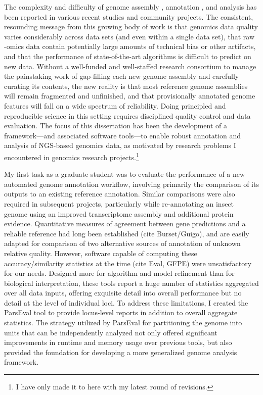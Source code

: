 The complexity and difficulty of genome assembly \cite{Assemblathon1,Assemblathon2,GAGE,QUAST}, annotation \cite{EGASP,Eilbeck,DentonFly}, and analysis \cite{PigWatson,RnaSeqTrim,RnaSeqTrim2} has been reported in various recent studies and community projects.
The consistent, resounding message from this growing body of work is that genomics data quality varies considerably across data sets (and even within a single data set), that raw -omics data contain potentially large amounts of technical bias or other artifacts, and that the performance of state-of-the-art algorithms is difficult to predict on new data.
Without a well-funded and well-staffed research consortium to manage the painstaking work of gap-filling each new genome assembly and carefully curating its contents, the new reality is that most reference genome assemblies will remain fragmented and unfinished, and that provisionally annotated genome features will fall on a wide spectrum of reliability.
Doing principled and reproducible science in this setting requires disciplined quality control and data evaluation.
The focus of this dissertation has been the development of a framework---and associated software tools---to enable robust annotation and analysis of NGS-based genomics data, as motivated by research problems I encountered in genomics research projects.\footnote{I have only made it to here with my latest round of revisions.}

My first task as a graduate student was to evaluate the performance of a new automated genome annotation workflow, involving primarily the comparison of its outputs to an existing reference annotation.
Similar comparisons were also required in subsequent projects, particularly while re-annotating an insect genome using an improved transcriptome assembly and additional protein evidence.
Quantitative measures of agreement between gene predictions and a reliable reference had long been established (cite Burset/Guigo), and are easily adapted for comparison of two alternative sources of annotation of unknown relative quality.
However, software capable of computing these accuracy/similarity statistics at the time (cite Eval, GFPE) were unsatisfactory for our needs.
Designed more for algorithm and model refinement than for biological interpretation, these tools report a huge number of statistics aggregated over all data inputs, offering exquisite detail into overall performance but no detail at the level of individual loci.
To address these limitations, I created the ParsEval tool to provide locus-level reports in addition to overall aggregate statistics.
The strategy utilized by ParsEval for partitioning the genome into units that can be independently analyzed not only offered significant improvements in runtime and memory usage over previous tools, but also provided the foundation for developing a more generalized genome analysis framework.

